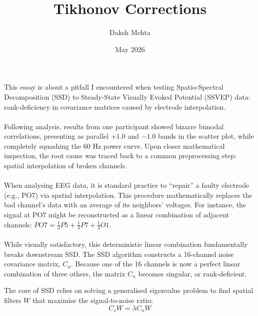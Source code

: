 \documentclass{article}
\title{Tikhonov Corrections}
\date{May 2026}
\author{Daksh Mehta}
\begin{document}
\maketitle

This essay is about a pitfall I encountered when testing Spatio-Spectral Decomposition (SSD) to Steady-State Visually Evoked Potential (SSVEP) data: rank-deficiency in covariance matrices caused by electrode interpolation. 
\\\\
Following analysis, results from one participant showed bizarre bimodal correlations, presenting as parallel $+1.0$ and $-1.0$ bands in the scatter plot, while completely squashing the 60 Hz power curve. Upon closer mathematical inspection, the root cause was traced back to a common preprocessing step: spatial interpolation of broken channels. 
\\\\
When analysing EEG data, it is standard practice to ``repair'' a faulty electrode (e.g., PO7) via spatial interpolation. This procedure mathematically replaces the bad channel's data with an average of its neighbors' voltages. For instance, the signal at PO7 might be reconstructed as a linear combination of adjacent channels: $PO7 = \frac{1}{3}P5 + \frac{1}{3}P7 + \frac{1}{3}O1$.
\\\\
While visually satisfactory, this deterministic linear combination fundamentally breaks downstream SSD. The SSD algorithm constructs a 16-channel noise covariance matrix, $C_n$. Because one of the 16 channels is now a perfect linear combination of three others, the matrix $C_n$ becomes singular, or rank-deficient. 

The core of SSD relies on solving a generalised eigenvalue problem to find spatial filters $W$ that maximise the signal-to-noise ratio:
\begin{equation}
    C_s W = \lambda C_n W
\end{equation}
\end{document}
